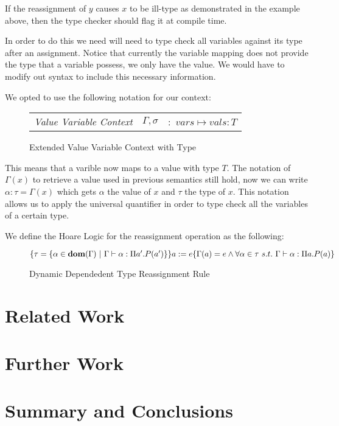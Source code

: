 \documentclass[a4paper,12pt]{report}
\begin{document}
\par
If the reassignment of $y$ causes $x$ to be ill-type as demonstrated in the 
example above, then the type checker should flag it at compile time. 

\par
In order to do this we need will need to type check all variables against its 
type after an assignment. Notice that currently the variable mapping does not 
provide the type that a variable possess, we only have the value. We would have 
to modify out syntax to include this necessary information. 

\par
We opted to use the following notation for our context: 
\begin{figure}[H]
  \begin{center}
    \begin{tabular} {l l l}
      \textit{Value Variable Context} & $\Gamma, \sigma$& $:$ $vars \mapsto vals : T$ 
    \end{tabular}
  \end{center}
  \caption{Extended Value Variable Context with Type}
\end{figure}

This means that a varible now maps to a value with type $T$. The notation of 
$\Gamma(x)$ to retrieve a value used in previous semantics still hold, now we 
can write $\alpha : \tau = \Gamma(x)$ which gets $\alpha$ the value of $x$ 
and $\tau$ the type of $x$. This notation allows us to apply the universal 
quantifier in order to type check all the variables of a certain type.
\par
We define the Hoare Logic for the reassignment operation as the following: 

\begin{figure}[H]
  \begin{center}
    \footnotesize$\{\tau = \{\alpha\in\text{\textbf{dom}}(\Gamma)\text{ }|\text{ }\Gamma \vdash \alpha : \Pi a'. P(a')\}\}a := e\{\Gamma(a) = e \wedge 
    \forall \alpha \in \tau\text{ }s.t.\text{ } \Gamma \vdash \alpha : \Pi a. P(a)\}$ 
    \normalsize
  \end{center}
  \caption{Dynamic Dependedent Type Reassignment Rule}
\end{figure}







\chapter{Related Work}

\chapter{Further Work}

\chapter{Summary and Conclusions} 


\appendix
\singlespacing

\printbibliography
\end{document}
